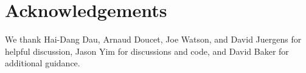 \section*{Acknowledgements}
We thank Hai-Dang Dau, Arnaud Doucet, Joe Watson, and David Juergens for helpful discussion,
Jason Yim for discussions and code,
and David Baker for additional guidance.